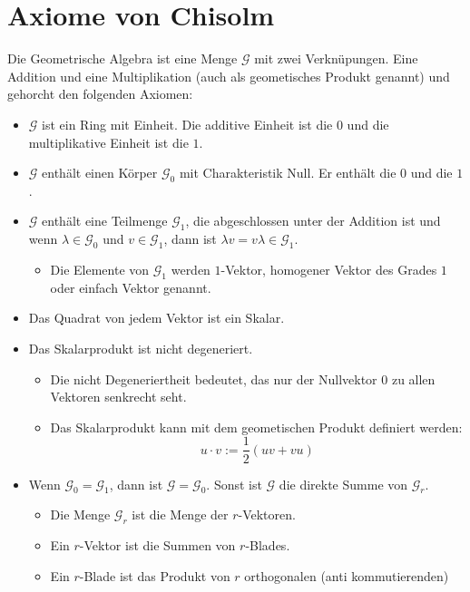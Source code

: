 \documentclass{sajzk}
\begin{document}
\section{Axiome von Chisolm}
\label{ompz}

Die Geometrische Algebra ist eine Menge $\mathscr{G}$ mit zwei Verknüpungen.
Eine Addition und eine Multiplikation (auch als geometisches Produkt genannt)
und gehorcht den folgenden Axiomen:
\begin{itemize}
    \item $\mathscr{G}$ ist ein Ring mit Einheit. Die additive Einheit ist die $0$ und
          die multiplikative Einheit ist die $1$.
    \item $\mathscr{G}$ enthält einen Körper $\mathscr{G}_0$ mit Charakteristik Null.
          Er enthält die $0$ und die $1$.
    \item $\mathscr{G}$ enthält eine Teilmenge $\mathscr{G}_1$, die abgeschlossen unter
          der Addition ist und wenn $\lambda\in\mathscr{G}_0$ und $v\in\mathscr{G}_1$,
          dann ist $\lambda v=v\lambda\in\mathscr{G}_1$.
    \begin{itemize}
        \item Die Elemente von $\mathscr{G}_1$ werden $1$-Vektor, homogener Vektor des
              Grades $1$ oder einfach Vektor genannt.
    \end{itemize}
\item Das Quadrat von jedem Vektor ist ein Skalar.
\item Das Skalarprodukt ist nicht degeneriert.
    \begin{itemize}
        \item Die nicht Degeneriertheit bedeutet, das nur der Nullvektor $0$ zu allen
              Vektoren senkrecht seht.
        \item Das Skalarprodukt kann mit dem geometischen Produkt definiert werden:
              $$u\cdot v :=\frac{1}{2}(uv+vu)$$
    \end{itemize}
\item Wenn $\mathscr{G}_0=\mathscr{G}_1$, dann ist $\mathscr{G}=\mathscr{G}_0$.
      Sonst ist $\mathscr{G}$ die direkte Summe von $\mathscr{G}_r$.
    \begin{itemize}
        \item Die Menge $\mathscr{G}_r$ ist die Menge der $r$-Vektoren.
        \item Ein $r$-Vektor ist die Summen von $r$-Blades.
        \item Ein $r$-Blade ist das Produkt von $r$ orthogonalen (anti kommutierenden)

\end{itemize}
\end{itemize}
\end{document}
